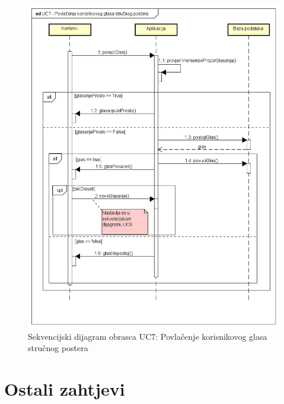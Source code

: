 				\begin{figure}[H]
					\includegraphics[width=\textwidth]{slike/uc7Sekvencijski.PNG} %
					\caption{Sekvencijski dijagram obrasca UC7: Povlačenje korisnikovog glasa stručnog postera}
					\label{fig:uc7-sekvencijski} %
				\end{figure}
				
		\section{Ostali zahtjevi}
		 
